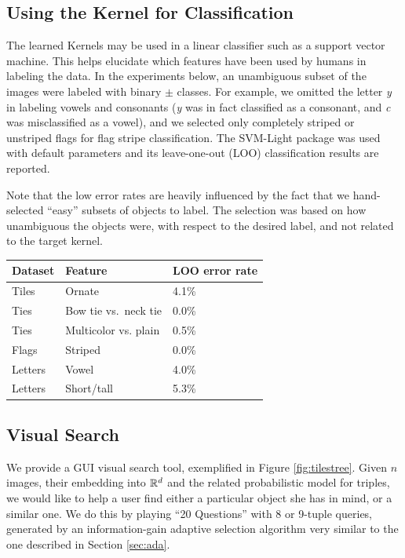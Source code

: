 \documentclass{article}
\begin{document}
\subsection{Using the Kernel for Classification}

The learned Kernels may be used in a linear classifier such as a
support vector machine.  This helps elucidate which features have been used
by humans in labeling the data.  In the experiments below, an unambiguous subset of the images were
labeled with binary $\pm$ classes. For example, we omitted the letter {\em y} in labeling vowels and consonants ({\em y} was in fact classified as a consonant, and {\em c} was misclassified as a vowel), and we selected only completely striped or unstriped flags for flag stripe classification.  The SVM-Light \cite{Joachims98} package was used with default
parameters and its leave-one-out (LOO) classification results are reported.


Note that the low error rates are heavily influenced by the fact that we hand-selected ``easy'' subsets of objects to label.  The selection was based on how unambiguous the objects were, with respect to the desired label, and not related to the target kernel.

\begin{tabular}{|l|l|l|}
 \hline
 Dataset & Feature & LOO error rate \\
 \hline
 \hline
Tiles & Ornate & 4.1\% \\
Ties & Bow tie vs.~neck tie & 0.0\%\\
Ties & Multicolor vs. plain & 0.5\%\\
Flags & Striped & 0.0\%\\
Letters & Vowel & 4.0\%\\
Letters & Short/tall & 5.3\%\\
\hline
\end{tabular}


\subsection{Visual Search}
We provide a GUI visual search tool, exemplified in Figure
\ref{fig:tilestree}. Given $n$ images, their embedding into $\mathbb{R}^d$
and the related probabilistic model for triples, we would like to help
a user find either a particular object she has in mind, or a similar
one. We do this by playing ``20 Questions'' with 8 or 9-tuple queries, generated by an information-gain 
adaptive selection algorithm very similar to the one described in Section \ref{sec:ada}.
\end{document}
